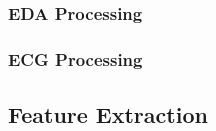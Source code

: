 \subsubsection{EDA Processing}

\subsubsection{ECG Processing}
\subsection{Feature Extraction}


%
%
%

